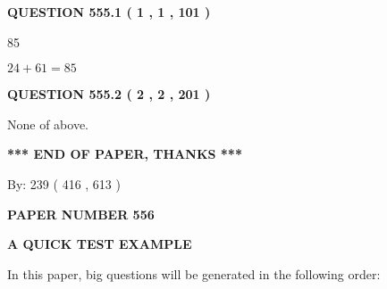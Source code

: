 \documentclass[12pt]{article}
\begin{document}
{\textbf{\Large{QUESTION
555.1 
 ( 1 , 1 , 101 )
}}}
  
  
 
 
\noindent{}

85
 
 
 
 
\noindent{}

$ %
24 +  %
61=   %
85$
 
 
  
\vspace{0.2in}
  
{\textbf{\Large{QUESTION
555.2 
 ( 2 , 2 , 201 )
}}}
  
  
 
 
\noindent{}
 
 
 None of above.
 
 
 
 
   
   
 \vspace{0.2in}
 
   
   
   
   
\vspace{1.0in} 
{\textbf{\large{ *** END OF PAPER, THANKS *** }}} 
   
   
\hspace{1.0in} By: 
 239 ( 416 ,  613 )
   
   
   
   
\newpage 
\setcounter{page}{ 
   556001 } 
   
   
   
   
 {\textbf{ \Large{ PAPER NUMBER  556  }}}
   
   
\vspace{0.2in}
   
   
   
   
   
   
 \vspace{0.2in}
{\LARGE {\textbf{ A QUICK TEST EXAMPLE}}}
   
   
   
\vspace{0.2in}
   
In this paper, big questions will be generated in the following order: 
   
\end{document}

